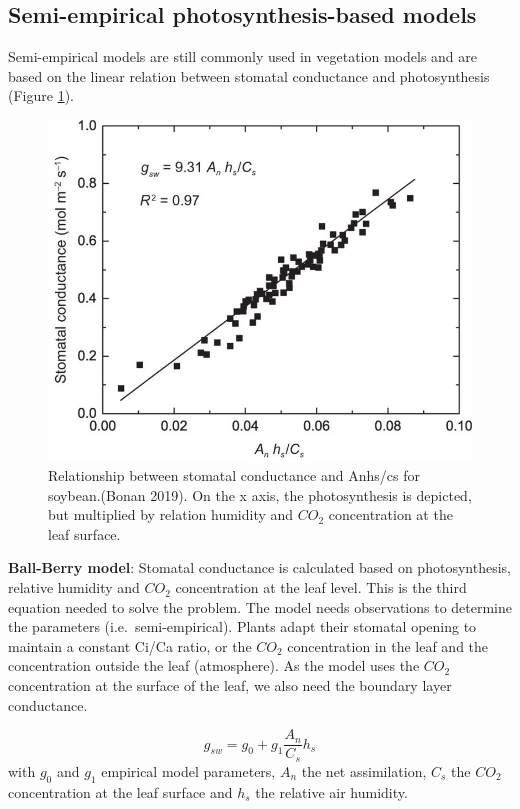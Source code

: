 \documentclass[
  12pt,
  oneside]{book}
\begin{document}
\hypertarget{semi-empirical-photosynthesis-based-models}{%
\subsection{Semi-empirical photosynthesis-based models}\label{semi-empirical-photosynthesis-based-models}}

Semi-empirical models are still commonly used in vegetation models and are based on the linear relation between stomatal conductance and photosynthesis (Figure \ref{fig:f213}).

\begin{figure}

{\centering \includegraphics[width=0.8\linewidth]{figures/chap2/ball_berry} 

}

\caption{Relationship between stomatal conductance and Anhs/cs for soybean.(Bonan 2019). On the x axis, the photosynthesis is depicted, but multiplied by relation humidity and $CO_2$ concentration at the leaf surface.}\label{fig:f213}
\end{figure}

\textbf{Ball-Berry model}: Stomatal conductance is calculated based on photosynthesis, relative humidity and \(CO_2\) concentration at the leaf level. This is the third equation needed to solve the problem. The model needs observations to determine the parameters (i.e.~semi-empirical).
Plants adapt their stomatal opening to maintain a constant Ci/Ca ratio, or the \(CO_2\) concentration in the leaf and the concentration outside the leaf (atmosphere).
As the model uses the \(CO_2\) concentration at the surface of the leaf, we also need the boundary layer conductance.

\[
g_{sw}=g_0 + g_1\frac{A_n}{C_s}h_s
\]
with \(g_0\) and \(g_1\) empirical model parameters, \(A_n\) the net assimilation, \(C_s\) the \(CO_2\) concentration at the leaf surface and \(h_s\) the relative air humidity.
\end{document}
